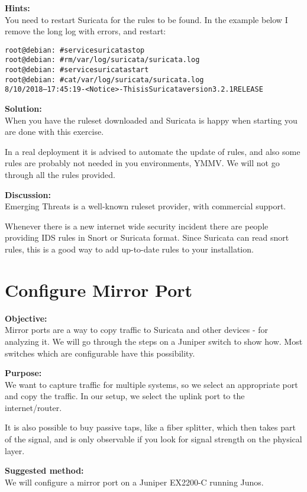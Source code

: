 \documentclass[a4paper,11pt,notitlepage]{report}
\begin{document}
{\bf Hints:}\\
You need to restart Suricata for the rules to be found. In the example below I remove the long log with errors, and restart:

\begin{alltt}\small
root@debian:~# service suricata stop
root@debian:~# rm /var/log/suricata/suricata.log
root@debian:~# service suricata start
root@debian:~# cat /var/log/suricata/suricata.log
8/10/2018 -- 17:45:19 - <Notice> - This is Suricata version 3.2.1 RELEASE
\end{alltt}

{\bf Solution:}\\
When you have the ruleset downloaded and Suricata is happy when starting you are done with this exercise.

In a real deployment it is advised to automate the update of rules, and also some rules are probably not needed in you environments, YMMV. We will not go through all the rules provided.

{\bf Discussion:}\\
Emerging Threats is a well-known ruleset provider, with commercial support.

Whenever there is a new internet wide security incident there are people providing IDS rules in Snort or Suricata format. Since Suricata can read snort rules, this is a good way to add up-to-date rules to your installation.

\chapter{Configure Mirror Port}
\label{ex:mirrorport}


{\bf Objective:} \\
Mirror ports are a way to copy traffic to Suricata and other devices - for analyzing it. We will go through the steps on a Juniper switch to show how.
Most switches which are configurable have this possibility.


{\bf Purpose:}\\
We want to capture traffic for multiple systems, so we select an appropriate port and copy the traffic. In our setup, we select the uplink port to the internet/router.

It is also possible to buy passive taps, like a fiber splitter, which then takes part of the signal, and is only observable if you look for signal strength on the physical layer.


{\bf Suggested method:}\\
We will configure a mirror port on a Juniper EX2200-C running Junos.
\end{document}
